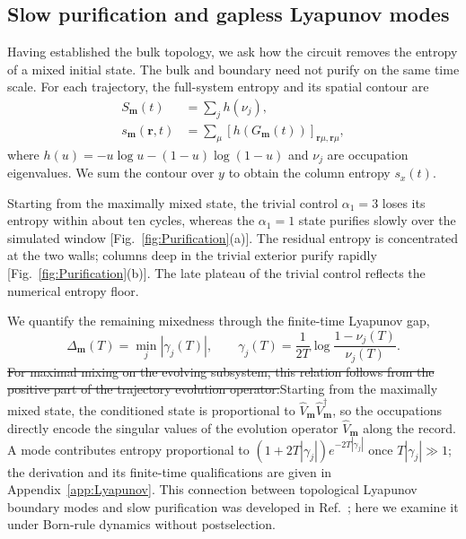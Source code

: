 \documentclass[aps,prb,10pt,twocolumn,superscriptaddress,longbibliography,floatfix]{revtex4-2}
\newcommand{\bfr}{\boldsymbol r}
\newcommand{\rec}{\mathbf m}   %
\newcommand{\claudeadd}[1]{{\color{orange}#1}}
\newcommand{\claudedel}[1]{{\color{orange}\sout{#1}}}
\begin{document}
{\color{blue}
\subsection{Slow purification and gapless Lyapunov modes}
\label{sec:Purification}

Having established the bulk topology, we ask how the circuit removes the entropy of a mixed initial state. The bulk and boundary need not purify on the same time scale. For each trajectory, the full-system entropy and its spatial contour are
\begin{align}
 S_{\rec}(t)&=\sum_j h(\nu_j),\nonumber\\
 s_{\rec}(\bfr,t)&=\sum_\mu[h(G_{\rec}(t))]_{\bfr\mu,\bfr\mu},
 \label{eq:BinaryEntropy}
\end{align}
where $h(u)=-u\log u-(1-u)\log(1-u)$ and $\nu_j$ are occupation eigenvalues. We sum the contour over $y$ to obtain the column entropy $s_x(t)$.

Starting from the maximally mixed state, the trivial control $\alpha_1=3$ loses its entropy within about ten cycles, whereas the $\alpha_1=1$ state purifies slowly over the simulated window [Fig.~\ref{fig:Purification}(a)]. The residual entropy is concentrated at the two walls; columns deep in the trivial exterior purify rapidly [Fig.~\ref{fig:Purification}(b)]. The late plateau of the trivial control reflects the numerical entropy floor.

We quantify the remaining mixedness through the finite-time Lyapunov gap,
\begin{equation}
 \Delta_{\rec}(T)=\min_j|\gamma_j(T)|,\qquad
 \gamma_j(T)=\frac{1}{2T}\log\frac{1-\nu_j(T)}{\nu_j(T)}.
 \label{eq:LyapunovFromOccupations}
\end{equation}
\claudedel{For maximal mixing on the evolving subsystem, this relation follows from the positive part of the trajectory evolution operator.}\claudeadd{Starting from the maximally mixed state, the conditioned state is proportional to $\hat V_{\rec}\hat V_{\rec}^\dagger$, so the occupations directly encode the singular values of the evolution operator $\hat V_{\rec}$ along the record.} A mode contributes entropy proportional to $(1+2T|\gamma_j|)e^{-2T|\gamma_j|}$ once $T|\gamma_j|\gg1$; the derivation and its finite-time qualifications are given in Appendix~\ref{app:Lyapunov}. This connection between topological Lyapunov boundary modes and slow purification was developed in Ref.~\cite{XiaoKawabata2026}; here we examine it under Born-rule dynamics without postselection.

}
\end{document}
